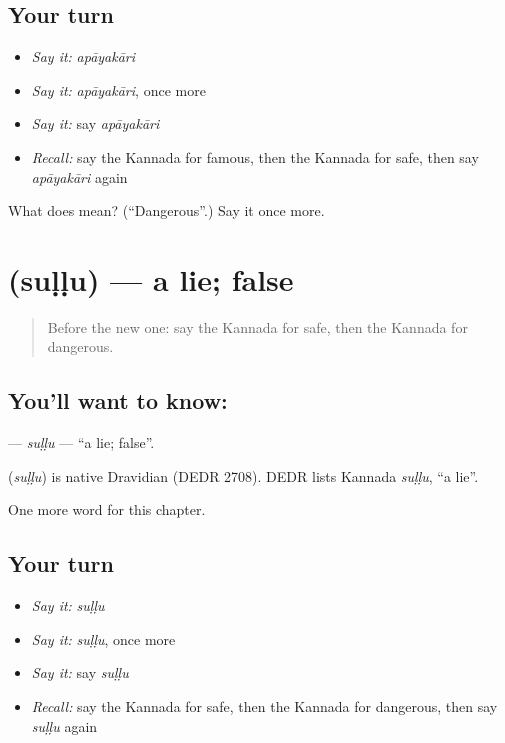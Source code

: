 \subsection*{Your turn}
\begin{itemize}
\raggedright
  \item \emph{Say it:} \emph{apāyakāri}
  \item \emph{Say it:} \emph{apāyakāri}, once more
  \item \emph{Say it:} say \emph{apāyakāri}
  \item \emph{Recall:} say the Kannada for famous, then the Kannada for safe, then say \emph{apāyakāri} again
\end{itemize}

\begin{tcolorbox}[breakable,colback=teal!4,colframe=teal!35!black,title={Before you move on}]
What does  mean? (\textquotedblleft{}Dangerous\textquotedblright{}.) Say it once more.
\end{tcolorbox}
\section[\texorpdfstring{\kn{ಸುಳ್ಳು} (suḷḷu)}{ಸುಳ್ಳು (suḷḷu)}]{ (suḷḷu) — a lie; false}

\label{lesson:KA-C144-sullu}



\begin{quote}
Before the new one: say the Kannada for safe, then the Kannada for dangerous.
\end{quote}

\subsection*{You'll want to know: }
\textbf{} — \emph{suḷḷu} — \textquotedblleft{}a lie; false\textquotedblright{}.

\begin{cousinweb}
\textbf{} (\emph{suḷḷu}) is native Dravidian (DEDR 2708). DEDR lists Kannada \emph{suḷḷu}, \textquotedblleft{}a lie\textquotedblright{}.
\end{cousinweb}

\begin{grammarlens}[title={What you've built}]
One more word for this chapter.
\end{grammarlens}

\subsection*{Your turn}
\begin{itemize}
\raggedright
  \item \emph{Say it:} \emph{suḷḷu}
  \item \emph{Say it:} \emph{suḷḷu}, once more
  \item \emph{Say it:} say \emph{suḷḷu}
  \item \emph{Recall:} say the Kannada for safe, then the Kannada for dangerous, then say \emph{suḷḷu} again
\end{itemize}

